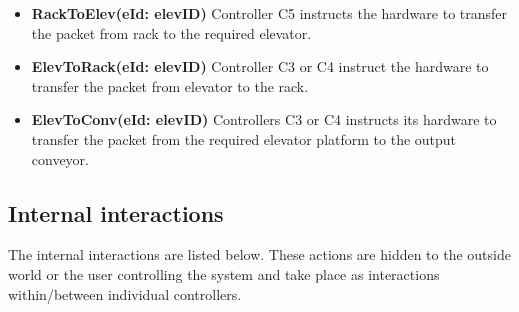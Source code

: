 \begin{itemize}
\item \textbf{RackToElev(eId: elevID)}
Controller C5 instructs the hardware to transfer the packet from rack to the required elevator.

\item \textbf{ElevToRack(eId: elevID)}
Controller C3 or C4 instruct the hardware to transfer the packet from elevator to the rack.

\item \textbf{ElevToConv(eId: elevID)}
Controllers C3 or C4 instructs its hardware to transfer the packet from the required elevator platform to the output conveyor.

\end{itemize}

\subsection*{Internal interactions}
The internal interactions are listed below. These actions are hidden to the outside world or the user controlling the system and take place as interactions within/between individual controllers.

